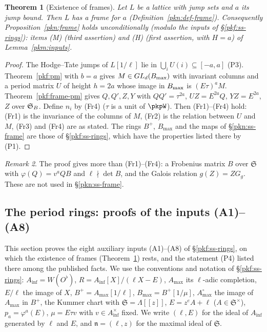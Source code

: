 \documentclass[10pt]{amsart}
\newtheorem{theorem}{Theorem}[section]
\theoremstyle{definition}
\theoremstyle{remark}
\newtheorem{remark}[theorem]{Remark}
\newcommand{\Q}{\mathbb Q}
\begin{document}
\begin{theorem}[Existence of frames]\label{pkf:main}
Let $L$ be a lattice with jump sets and $a$ its jump bound. Then $L$ has a frame for $a$
(Definition~\ref{pkn:def-frame}). Consequently Proposition~\ref{pkn:frame} holds unconditionally (modulo
the inputs of \S\ref{pkf:ss-rings}): items (M) (third assertion) and (H) (first assertion, with $H=a$)
of Lemma~\ref{pkm:inputs}.
\end{theorem}

\begin{proof}
The Hodge--Tate jumps of $L[1/\ell]$ lie in $\bigcup_iU(i)\subseteq[-a,a]$ (P3). Theorem~\ref{pkf:pm}
with $b=a$ gives $M\in GL_d(\pkfBm)$ with invariant columns and a period matrix $U$ of height $h=2a$
whose image in $\pkfBm$ is $(E\tau)^aM$. Theorem~\ref{pkf:frame-pm} gives $Q,Q',Z,Y$ with $QQ'=
\tau^{2a}$, $UZ=E^{2a}Q$, $YZ=E^{2a}$, $Z$ over $\pkfSB$. Define $n_i$ by (Fr4) ($\tau$ is a unit of
$\pkpW$). Then (Fr1)--(Fr4) hold: (Fr1) is the invariance of the columns of $M$, (Fr2) is the
relation between $U$ and $M$, (Fr3) and (Fr4) are as stated. The rings $B^+$, $B_{\max}$ and the
maps of \S\ref{pkn:ss-frame} are those of \S\ref{pkf:ss-rings}, which have the properties listed
there by (P1).
\end{proof}

\begin{remark}\label{pkf:rem-extra}
The proof gives more than (Fr1)--(Fr4): a Frobenius matrix $B$ over $\mathfrak S$ with
$\varphi(Q)=v^aQB$ and $\ell\nmid\det B$, and the Galois relation $g(Z)=ZG_g$. These are not used in
\S\ref{pkn:ss-frame}.
\end{remark}



\providecommand{\auO}{\mathcal O}
\providecommand{\auQlb}{\overline{\Q}_\ell}
\providecommand{\pkpA}{A_{\mathrm{inf}}}
\providecommand{\pknBp}{B^+_{\mathrm{dR}}}
\providecommand{\pknB}{B_{\mathrm{dR}}}
\providecommand{\pkfAm}{A_{\max}}
\providecommand{\pkfAo}{A_{\max}^{\circ}}
\providecommand{\pkfBp}{B^+}
\providecommand{\pkfBm}{B_{\max}}
\providecommand{\pkfSB}{\mathfrak S_B}
\providecommand{\pkrI}{(\ell,E)}
\providecommand{\pkrm}{\mathfrak n}

\subsection{The period rings: proofs of the inputs (A1)--(A8)}\label{pkr:sec}

This section proves the eight auxiliary inputs (A1)--(A8) of \S\ref{pkf:ss-rings}, on which the
existence of frames (Theorem~\ref{pkf:main}) rests, and the statement (P4) listed there among the
published facts. We use the conventions and notation of \S\ref{pkf:ss-rings}:
$\pkpA=W(O^\flat)$, $R=\pkpA[X]/(\ell X-E)$, $\pkfAm$ its $\ell$-adic completion, $E/\ell$ the image
of $X$, $\pkfBp=\pkfAm[1/\ell]$, $\pkfBm=\pkfBp[1/\mu]$, $\pkfAo$ the image of $\pkfAm$ in $\pkfBp$,
the Kummer chart with $\mathfrak S=\Lambda[[z]]$, $E=z^eA+\ell$ ($A\in\mathfrak S^\times$),
$p_a=\varphi^a(E)$, $\mu=E\tau v$ with $v\in\pkpA^\times$ fixed. We write $\pkrI$ for the ideal of
$\pkpA$ generated by $\ell$ and $E$, and $\pkrm=(\ell,z)$ for the maximal ideal of $\mathfrak S$.
\end{document}
